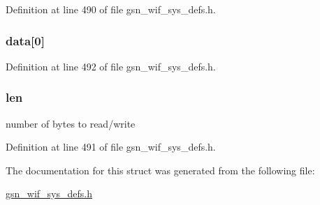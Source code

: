 Definition at line 490 of file gsn\_\-wif\_\-sys\_\-defs.h.

\hypertarget{a00357_a29500e452cff835f2b70d1dff36f918a}{
\subsubsection[{data}]{ {\bf data}\mbox{[}0\mbox{]}}}
\label{a00357_a29500e452cff835f2b70d1dff36f918a}


Definition at line 492 of file gsn\_\-wif\_\-sys\_\-defs.h.

\hypertarget{a00357_ab9abc6ede61238a05664f9c37e4412c3}{
\subsubsection[{len}]{ {\bf len}}}
\label{a00357_ab9abc6ede61238a05664f9c37e4412c3}
number of bytes to read/write 

Definition at line 491 of file gsn\_\-wif\_\-sys\_\-defs.h.



The documentation for this struct was generated from the following file:\begin{DoxyCompactItemize}
\item 
\hyperlink{a00612}{gsn\_\-wif\_\-sys\_\-defs.h}\end{DoxyCompactItemize}
